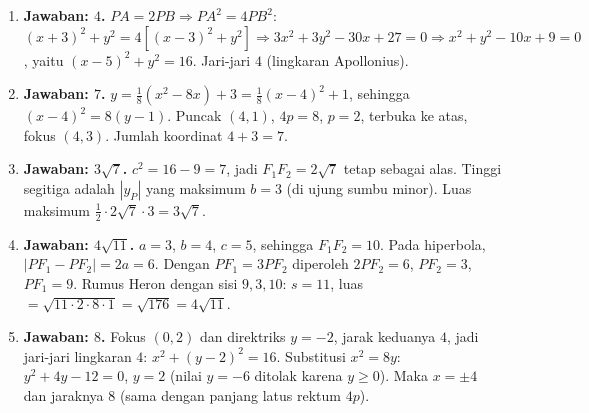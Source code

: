 \documentclass[a4paper,11pt]{article}
\newcounter{no}
\begin{document}
\small\begin{enumerate}[leftmargin=2em,itemsep=2pt,topsep=2pt]
\item[\textbf{1.}] \textbf{Jawaban: $4$.} $PA=2PB\Rightarrow PA^2=4PB^2$: $(x+3)^2+y^2=4\left[(x-3)^2+y^2\right]\Rightarrow3x^2+3y^2-30x+27=0\Rightarrow x^2+y^2-10x+9=0$, yaitu $(x-5)^2+y^2=16$. Jari-jari $4$ (lingkaran Apollonius).
\item[\textbf{2.}] \textbf{Jawaban: $7$.} $y=\frac18(x^2-8x)+3=\frac18(x-4)^2+1$, sehingga $(x-4)^2=8(y-1)$. Puncak $(4,1)$, $4p=8$, $p=2$, terbuka ke atas, fokus $(4,3)$. Jumlah koordinat $4+3=7$.
\item[\textbf{3.}] \textbf{Jawaban: $3\sqrt7$.} $c^2=16-9=7$, jadi $F_1F_2=2\sqrt7$ tetap sebagai alas. Tinggi segitiga adalah $|y_P|$ yang maksimum $b=3$ (di ujung sumbu minor). Luas maksimum $\frac12\cdot2\sqrt7\cdot3=3\sqrt7$.
\item[\textbf{4.}] \textbf{Jawaban: $4\sqrt{11}$.} $a=3$, $b=4$, $c=5$, sehingga $F_1F_2=10$. Pada hiperbola, $|PF_1-PF_2|=2a=6$. Dengan $PF_1=3PF_2$ diperoleh $2PF_2=6$, $PF_2=3$, $PF_1=9$. Rumus Heron dengan sisi $9,3,10$: $s=11$, luas $=\sqrt{11\cdot2\cdot8\cdot1}=\sqrt{176}=4\sqrt{11}$.
\item[\textbf{5.}] \textbf{Jawaban: $8$.} Fokus $(0,2)$ dan direktriks $y=-2$, jarak keduanya $4$, jadi jari-jari lingkaran $4$: $x^2+(y-2)^2=16$. Substitusi $x^2=8y$: $y^2+4y-12=0$, $y=2$ (nilai $y=-6$ ditolak karena $y\ge0$). Maka $x=\pm4$ dan jaraknya $8$ (sama dengan panjang latus rektum $4p$).
\end{enumerate}
\par{}\par\vspace{0.2em}
\end{document}
